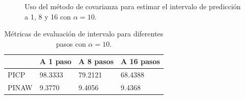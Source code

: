 \documentclass[12pt]{article}
\begin{document}
\begin{figure}[h!]
	\centering
	\captionsetup{justification=centering}
	 \newline
	\caption{Uso del método de covarianza para estimar el intervalo de predicción a 1, 8 y 16 con $\alpha=10$.}
	\label{cov_val_10}
\end{figure}

\begin{table}[h!]
	\centering
	\caption{Métricas de evaluación de intervalo para diferentes pasos con $\alpha = 10$.}
	\begin{tabular}{|l|l|l|l|}
		\hline
		& A 1 paso &A 8 pasos & A 16 pasos \\\hline
		PICP     &  98.3333   & 79.2121   & 68.4388   \\ \hline
		PINAW    & 9.3770   & 9.4056    & 9.4368    \\ \hline
	\end{tabular}
	\label{pinc_red_10}
\end{table}
\end{document}
